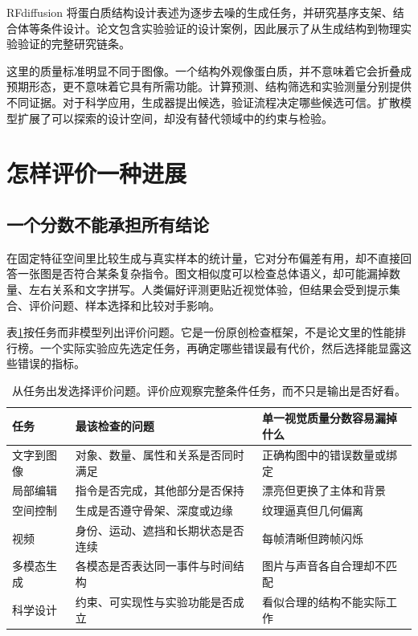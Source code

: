 RFdiffusion 将蛋白质结构设计表述为逐步去噪的生成任务，并研究基序支架、结合体等条件设计。论文包含实验验证的设计案例，因此展示了从生成结构到物理实验验证的完整研究链条。\cite{a_rfdiffusion}

这里的质量标准明显不同于图像。一个结构外观像蛋白质，并不意味着它会折叠成预期形态，更不意味着它具有所需功能。计算预测、结构筛选和实验测量分别提供不同证据。对于科学应用，生成器提出候选，验证流程决定哪些候选可信。扩散模型扩展了可以探索的设计空间，却没有替代领域中的约束与检验。

\section{怎样评价一种进展}
\label{sec:application-evaluation}

\subsection{一个分数不能承担所有结论}

在固定特征空间里比较生成与真实样本的统计量，它对分布偏差有用，却不直接回答一张图是否符合某条复杂指令。图文相似度可以检查总体语义，却可能漏掉数量、左右关系和文字拼写。人类偏好评测更贴近视觉体验，但结果会受到提示集合、评价问题、样本选择和比较对手影响。

表\ref{tab:application-evaluation}按任务而非模型列出评价问题。它是一份原创检查框架，不是论文里的性能排行榜。一个实际实验应先选定任务，再确定哪些错误最有代价，然后选择能显露这些错误的指标。

\begin{table}[htbp]
\centering
\small
\begin{tabularx}{\linewidth}{@{}p{2.1cm}XX@{}}
\toprule
任务 & 最该检查的问题 & 单一视觉质量分数容易漏掉什么\\
\midrule
文字到图像 & 对象、数量、属性和关系是否同时满足 & 正确构图中的错误数量或绑定\\
局部编辑 & 指令是否完成，其他部分是否保持 & 漂亮但更换了主体和背景\\
空间控制 & 生成是否遵守骨架、深度或边缘 & 纹理逼真但几何偏离\\
视频 & 身份、运动、遮挡和长期状态是否连续 & 每帧清晰但跨帧闪烁\\
多模态生成 & 各模态是否表达同一事件与时间结构 & 图片与声音各自合理却不匹配\\
科学设计 & 约束、可实现性与实验功能是否成立 & 看似合理的结构不能实际工作\\
\bottomrule
\end{tabularx}
\caption{从任务出发选择评价问题。评价应观察完整条件任务，而不只是输出是否好看。}
\label{tab:application-evaluation}
\end{table}

